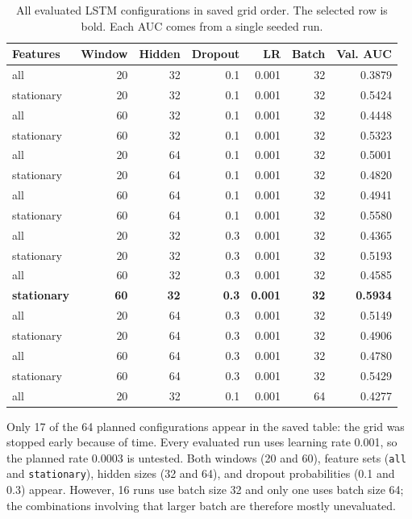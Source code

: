 \begin{table}[H]
    \centering
    \small
    \begin{tabular}{lrrrrrr}
        \toprule
        Features & Window & Hidden & Dropout & LR & Batch & Val. AUC \\
        \midrule
        all        & 20 & 32 & 0.1 & 0.001 & 32 & 0.3879 \\
        stationary & 20 & 32 & 0.1 & 0.001 & 32 & 0.5424 \\
        all        & 60 & 32 & 0.1 & 0.001 & 32 & 0.4448 \\
        stationary & 60 & 32 & 0.1 & 0.001 & 32 & 0.5323 \\
        all        & 20 & 64 & 0.1 & 0.001 & 32 & 0.5001 \\
        stationary & 20 & 64 & 0.1 & 0.001 & 32 & 0.4820 \\
        all        & 60 & 64 & 0.1 & 0.001 & 32 & 0.4941 \\
        stationary & 60 & 64 & 0.1 & 0.001 & 32 & 0.5580 \\
        all        & 20 & 32 & 0.3 & 0.001 & 32 & 0.4365 \\
        stationary & 20 & 32 & 0.3 & 0.001 & 32 & 0.5193 \\
        all        & 60 & 32 & 0.3 & 0.001 & 32 & 0.4585 \\
        \textbf{stationary} & \textbf{60} & \textbf{32} & \textbf{0.3} & \textbf{0.001} & \textbf{32} & \textbf{0.5934} \\
        all        & 20 & 64 & 0.3 & 0.001 & 32 & 0.5149 \\
        stationary & 20 & 64 & 0.3 & 0.001 & 32 & 0.4906 \\
        all        & 60 & 64 & 0.3 & 0.001 & 32 & 0.4780 \\
        stationary & 60 & 64 & 0.3 & 0.001 & 32 & 0.5429 \\
        all        & 20 & 32 & 0.1 & 0.001 & 64 & 0.4277 \\
        \bottomrule
    \end{tabular}
    \caption{All evaluated LSTM configurations in saved grid order. The selected row is bold. Each AUC comes from a single seeded run.}
    \label{tab:b-deep-grid}
\end{table}

Only 17 of the 64 planned configurations appear in the saved table: the grid was stopped early because of time. Every evaluated run uses learning rate 0.001, so the planned rate 0.0003 is untested. Both windows (20 and 60), feature sets (\texttt{all} and \texttt{stationary}), hidden sizes (32 and 64), and dropout probabilities (0.1 and 0.3) appear. However, 16 runs use batch size 32 and only one uses batch size 64; the combinations involving that larger batch are therefore mostly unevaluated.


